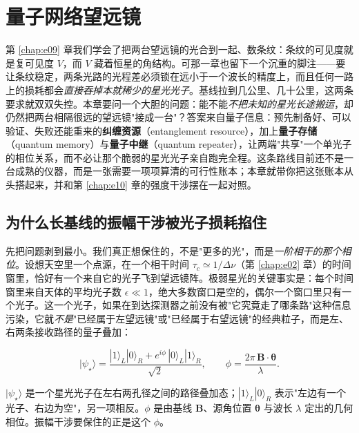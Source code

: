 \chapter{量子网络望远镜}
\label{chap:e24}

\begin{chapteropening}
第 \ref{chap:e09} 章我们学会了把两台望远镜的光合到一起、数条纹：条纹的可见度就是复可见度 \(V\)，而 \(V\) 藏着恒星的角结构。可那一章也留下一个沉重的脚注——要让条纹稳定，两条光路的光程差必须锁在远小于一个波长的精度上，而且任何一路上的损耗都会\emph{直接吞掉本就稀少的星光光子}。基线拉到几公里、几十公里，这两条要求就双双失控。本章要问一个大胆的问题：能不能\emph{不把未知的星光长途搬运}，却仍然把两台相隔很远的望远镜"接成一台"？答案来自量子信息：预先制备好、可以验证、失败还能重来的\textbf{纠缠资源}（entanglement resource），加上\textbf{量子存储}（quantum memory）与\textbf{量子中继}（quantum repeater），让两端"共享"一个单光子的相位关系，而不必让那个脆弱的星光光子亲自跑完全程。这条路线目前还不是一台成熟的仪器，而是一张需要一项项算清的可行性账本；本章就带你把这张账本从头搭起来，并和第 \ref{chap:e10} 章的强度干涉摆在一起对照。
\end{chapteropening}

\section{为什么长基线的振幅干涉被光子损耗掐住}
\label{sec:e24-why-loss}

先把问题剥到最小。我们真正想保住的，不是"更多的光"，而是\emph{一阶相干的那个相位}。设想天空里一个点源，在一个相干时间 \(\tau_c\simeq1/\Delta\nu\)（第 \ref{chap:e02} 章）的时间窗里，恰好有一个来自它的光子飞到望远镜阵。极弱星光的关键事实是：每个时间窗里来自天体的平均光子数 \(\epsilon\ll1\)，绝大多数窗口是空的，偶尔一个窗口里只有一个光子。这一个光子，如果在到达探测器之前没有被"它究竟走了哪条路"这种信息污染，它就\emph{不是}"已经属于左望远镜"或"已经属于右望远镜"的经典粒子，而是左、右两条接收路径的量子叠加：

\begin{equation}
  |\psi_\star\rangle
  =
  \frac{|1\rangle_L|0\rangle_R
  +
  e^{i\phi}\,|0\rangle_L|1\rangle_R}{\sqrt2},
  \qquad
  \phi=\frac{2\pi\,\bm{B}\cdot\bm{\theta}}{\lambda}.
  \label{eq:e24-stellar-single-photon}
\end{equation}
\begin{formulaexplain}
\(|\psi_\star\rangle\) 是一个星光光子在左右两孔径之间的路径叠加态；\(|1\rangle_L|0\rangle_R\) 表示"左边有一个光子、右边为空"，另一项相反。\(\phi\) 是由基线 \(\bm{B}\)、源角位置 \(\bm{\theta}\) 与波长 \(\lambda\) 定出的几何相位。振幅干涉要保住的正是这个 \(\phi\)。
\end{formulaexplain}

